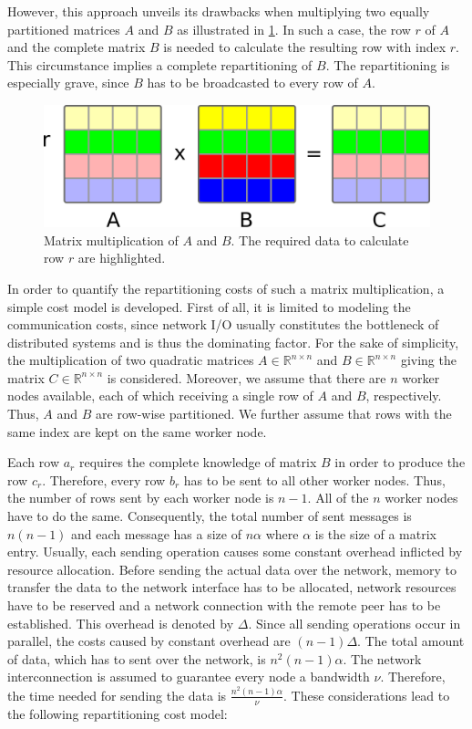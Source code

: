 However, this approach unveils its drawbacks when multiplying two equally partitioned matrices $A$ and $B$ as illustrated in \cref{fig:rowPartitioningMM}.
In such a case, the row $r$ of $A$ and the complete matrix $B$ is needed to calculate the resulting row with index $r$.
This circumstance implies a complete repartitioning of $B$.
The repartitioning is especially grave, since $B$ has to be broadcasted to every row of $A$.

\begin{figure}[!h]
	\centering
	\includegraphics[width=0.6\linewidth]{images/rowMM.png}
	\caption{Matrix multiplication of $A$ and $B$. The required data to calculate row $r$ are highlighted.}
	\label{fig:rowPartitioningMM}
\end{figure}

In order to quantify the repartitioning costs of such a matrix multiplication, a simple cost model is developed.
First of all, it is limited to modeling the communication costs, since network I/O usually constitutes the bottleneck of distributed systems and is thus the dominating factor.
For the sake of simplicity, the multiplication of two quadratic matrices $A \in \mathbb{R}^{n\times n}$ and $B \in \mathbb{R}^{n\times n}$ giving the matrix $C\in \mathbb{R}^{n \times n}$ is considered.
Moreover, we assume that there are $n$ worker nodes available, each of which receiving a single row of $A$ and $B$, respectively.
Thus, $A$ and $B$ are row-wise partitioned.
We further assume that rows with the same index are kept on the same worker node.

Each row $a_r$ requires the complete knowledge of matrix $B$ in order to produce the row $c_r$.
Therefore, every row $b_r$ has to be sent to all other worker nodes.
Thus, the number of rows sent by each worker node is $n-1$.
All of the $n$ worker nodes have to do the same.
Consequently, the total number of sent messages is $n(n-1)$ and each message has a size of $n\alpha$ where $\alpha$ is the size of a matrix entry.
Usually, each sending operation causes some constant overhead inflicted by resource allocation.
Before sending the actual data over the network, memory to transfer the data to the network interface has to be allocated, network resources have to be reserved and a network connection with the remote peer has to be established.
This overhead is denoted by $\Delta$.
Since all sending operations occur in parallel, the costs caused by constant overhead are $(n-1)\Delta$.
The total amount of data, which has to sent over the network, is $n^2(n-1)\alpha$.
The network interconnection is assumed to guarantee every node a bandwidth $\nu$.
Therefore, the time needed for sending the data is $\frac{n^2(n-1)\alpha}{\nu}$.
These considerations lead to the following repartitioning cost model:

